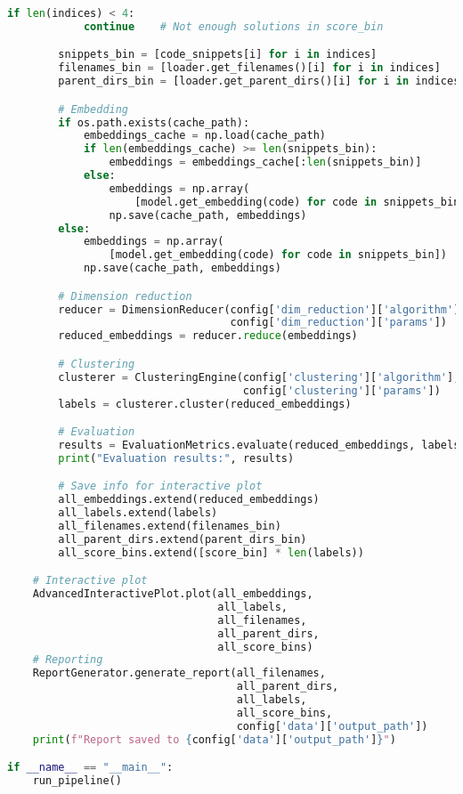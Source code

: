 \begin{lstlisting}[language=Python, caption={Pipeline}, label={prco:Pipel}]
        if len(indices) < 4:
            continue    # Not enough solutions in score_bin

        snippets_bin = [code_snippets[i] for i in indices]
        filenames_bin = [loader.get_filenames()[i] for i in indices]
        parent_dirs_bin = [loader.get_parent_dirs()[i] for i in indices]

        # Embedding
        if os.path.exists(cache_path):
            embeddings_cache = np.load(cache_path)
            if len(embeddings_cache) >= len(snippets_bin):
                embeddings = embeddings_cache[:len(snippets_bin)]
            else:
                embeddings = np.array(
                    [model.get_embedding(code) for code in snippets_bin])
                np.save(cache_path, embeddings)
        else:
            embeddings = np.array(
                [model.get_embedding(code) for code in snippets_bin])
            np.save(cache_path, embeddings)

        # Dimension reduction
        reducer = DimensionReducer(config['dim_reduction']['algorithm'],
                                   config['dim_reduction']['params'])
        reduced_embeddings = reducer.reduce(embeddings)

        # Clustering
        clusterer = ClusteringEngine(config['clustering']['algorithm'],
                                     config['clustering']['params'])
        labels = clusterer.cluster(reduced_embeddings)

        # Evaluation
        results = EvaluationMetrics.evaluate(reduced_embeddings, labels)
        print("Evaluation results:", results)

        # Save info for interactive plot
        all_embeddings.extend(reduced_embeddings)
        all_labels.extend(labels)
        all_filenames.extend(filenames_bin)
        all_parent_dirs.extend(parent_dirs_bin)
        all_score_bins.extend([score_bin] * len(labels))

    # Interactive plot
    AdvancedInteractivePlot.plot(all_embeddings,
                                 all_labels,
                                 all_filenames,
                                 all_parent_dirs,
                                 all_score_bins)
    # Reporting
    ReportGenerator.generate_report(all_filenames,
                                    all_parent_dirs,
                                    all_labels,
                                    all_score_bins,
                                    config['data']['output_path'])
    print(f"Report saved to {config['data']['output_path']}")

if __name__ == "__main__":
    run_pipeline()
\end{lstlisting}


